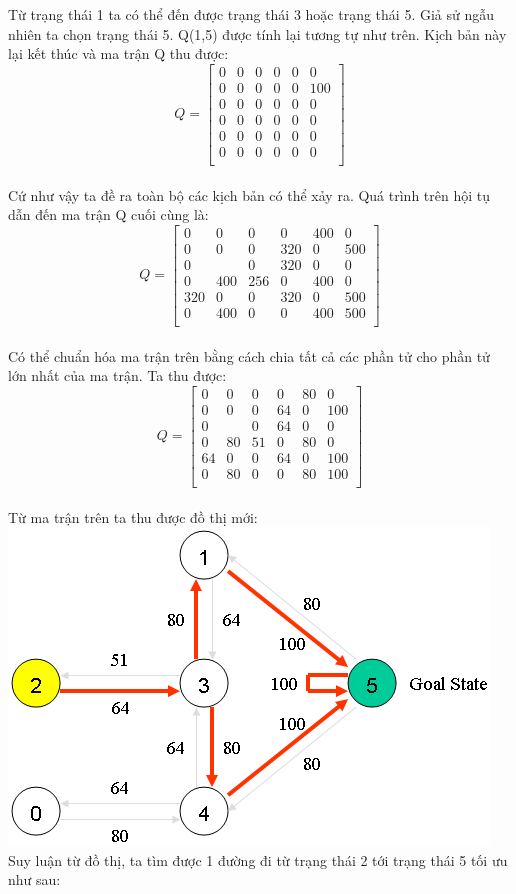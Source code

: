 \documentclass[14pt,a4paper,oneside]{report}		%
\begin{document}
Từ trạng thái 1 ta có thể đến được trạng thái 3 hoặc trạng thái 5. Giả sử ngẫu nhiên ta chọn trạng thái 5. Q(1,5) được tính lại tương tự như trên. Kịch bản này lại kết thúc và ma trận Q thu được:
$$Q=\begin{bmatrix}
0&0&0&0&0&0\\
0&0&0&0&0&100\\
0&0&0&0&0&0\\
0&0&0&0&0&0\\
0&0&0&0&0&0\\
0&0&0&0&0&0\\
\end{bmatrix}$$\\
Cứ như vậy ta đề ra toàn bộ các kịch bản có thể xảy ra. Quá trình trên hội tụ dẫn đến ma trận Q cuối cùng là:
$$Q=\begin{bmatrix}
0&0&0&0&400&0\\
0&0&0&320&0&500\\
0&&0&320&0&0\\
0&400&256&0&400&0\\
320&0&0&320&0&500\\
0&400&0&0&400&500\\
\end{bmatrix}$$\\
Có thể chuẩn hóa ma trận trên bằng cách chia tất cả các phần tử cho phần tử lớn nhất của ma trận. Ta thu được:
$$Q=\begin{bmatrix}
0&0&0&0&80&0\\
0&0&0&64&0&100\\
0&&0&64&0&0\\
0&80&51&0&80&0\\
64&0&0&64&0&100\\
0&80&0&0&80&100\\
\end{bmatrix}$$\\
Từ ma trận trên ta thu được đồ thị mới:\\
\includegraphics[width=\textwidth,height=\textheight,keepaspectratio]{5.png}
\\
Suy luận từ đồ thị, ta tìm được 1 đường đi từ trạng thái 2 tới trạng thái 5 tối ưu như sau:
\end{document}

